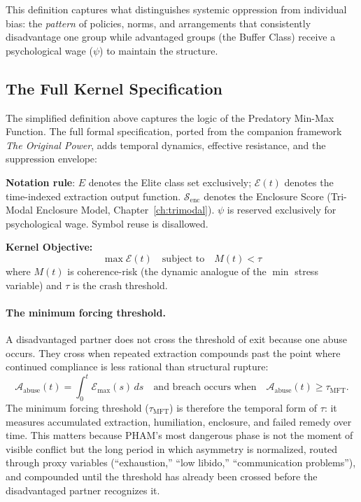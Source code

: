 \documentclass[12pt,openany]{book}
\numberwithin{equation}{chapter}
\begin{document}
This definition captures what distinguishes systemic oppression from individual bias: the \textit{pattern} of policies, norms, and arrangements that consistently disadvantage one group while advantaged groups (the Buffer Class) receive a psychological wage ($\psi$) to maintain the structure.

\subsection{The Full Kernel Specification}

The simplified definition above captures the logic of the Predatory Min-Max Function. The full formal specification, ported from the companion framework \textit{The Original Power}, adds temporal dynamics, effective resistance, and the suppression envelope:

\textbf{Notation rule}: $E$ denotes the Elite class set exclusively; $\mathcal{E}(t)$ denotes the time-indexed extraction output function. $\mathcal{S}_{\text{enc}}$ denotes the Enclosure Score (Tri-Modal Enclosure Model, Chapter~\ref{ch:trimodal}). $\psi$ is reserved exclusively for psychological wage. Symbol reuse is disallowed.

\textbf{Kernel Objective:}
\begin{equation}\label{eq:kernel-optimization}
\max \mathcal{E}(t) \quad \text{subject to} \quad M(t) < \tau
\end{equation}
where $M(t)$ is coherence-risk (the dynamic analogue of the $\min$ stress variable) and $\tau$ is the crash threshold.

\paragraph{The minimum forcing threshold.}
A disadvantaged partner does not cross the threshold of exit because one abuse occurs. They cross when repeated extraction compounds past the point where continued compliance is less rational than structural rupture:
\begin{equation}\label{eq:minimum-forcing-threshold}
\mathcal{A}_{\text{abuse}}(t)
=
\int_{0}^{t} \mathcal{E}_{\max}(s)\,ds
\quad \text{and breach occurs when} \quad
\mathcal{A}_{\text{abuse}}(t) \geq \tau_{\text{MFT}} .
\end{equation}
The minimum forcing threshold ($\tau_{\text{MFT}}$) is therefore the temporal form of $\tau$: it measures accumulated extraction, humiliation, enclosure, and failed remedy over time. This matters because PHAM's most dangerous phase is not the moment of visible conflict but the long period in which asymmetry is normalized, routed through proxy variables (``exhaustion,'' ``low libido,'' ``communication problems''), and compounded until the threshold has already been crossed before the disadvantaged partner recognizes it.
\end{document}

